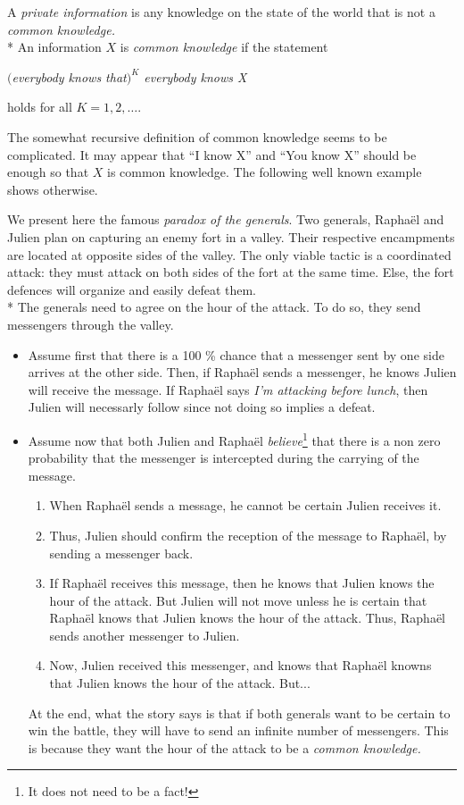 \begin{definition}
A \emph{private information} is any knowledge on the state of the world that is not a \emph{common knowledge.}\\*
An information $X$ is \emph{common knowledge} if the statement 
\begin{center}
\emph{$($everybody knows that$)^K$ everybody knows X}
\end{center}
holds for all $K = 1, 2, \ldots$.
\end{definition}
 
 The somewhat recursive definition of common knowledge seems to be complicated. 
 It may appear that ``I know X'' and ``You know X'' should be enough so that $X$ is common knowledge. The following well known example shows otherwise.
 
 \begin{example}
 We present here the famous \emph{paradox of the generals}.
 Two generals, Rapha\"el and Julien plan on capturing an enemy fort in a valley.
 Their respective encampments are located at opposite sides of the valley.
 The only viable tactic is a coordinated attack: they must attack on both sides of the fort at the same time. Else, the fort defences will organize and easily defeat them. \\*
 The generals need to agree on the hour of the attack. To do so, they send messengers through the valley.
\begin{itemize}
\item Assume first that there is a 100 \% chance that a messenger sent by one side arrives at the other side. Then, if Rapha\"el sends a messenger, he knows Julien will receive the message. If Rapha\"el says \emph{I'm attacking before lunch}, then Julien will necessarly follow since not doing so implies a defeat.
\item Assume now that both Julien and Rapha\"el \emph{believe}\footnote{It does not need to be a fact!} that there is a non zero probability that the messenger is intercepted during the carrying of the message.
\begin{enumerate}
\item When Rapha\"el sends a message, he cannot be certain Julien receives it. \item Thus, Julien should confirm the reception of the message to Rapha\"el, by sending a messenger back.
\item If Rapha\"el receives this message, then he knows that Julien knows the hour of the attack. But Julien will not move unless he is certain that Rapha\"el knows that Julien knows the hour of the attack. Thus, Rapha\"el sends another messenger to Julien.
\item Now, Julien received this messenger, and knows that Rapha\"el knowns that Julien knows the hour of the attack. But...
\end{enumerate}
At the end, what the story says is that if both generals want to be certain to win the battle, they will have to send an infinite number of messengers.
This is because they want the hour of the attack to be a \emph{common knowledge.}
\end{itemize}
\end{example}
 
